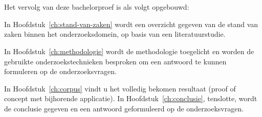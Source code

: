 \section{}
\label{sec:opzet-bachelorproef}


Het vervolg van deze bachelorproef is als volgt opgebouwd:

In Hoofdstuk~\ref{ch:stand-van-zaken} wordt een overzicht gegeven van de stand van zaken binnen het onderzoeksdomein, op basis van een literatuurstudie.

In Hoofdstuk~\ref{ch:methodologie} wordt de methodologie toegelicht en worden de gebruikte onderzoekstechnieken besproken om een antwoord te kunnen formuleren op de onderzoeksvragen.


In Hoofdstuk~\ref{ch:corpus} vindt u het volledig bekomen resultaat (proof of concept met bijhorende applicatie).
\newline
\newline
In Hoofdstuk~\ref{ch:conclusie}, tenslotte, wordt de conclusie gegeven en een antwoord geformuleerd op de onderzoeksvragen.
